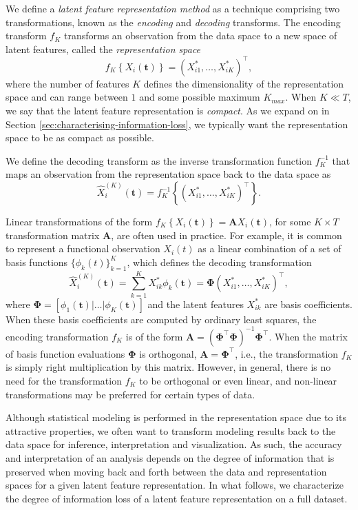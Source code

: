 We define a \emph{latent feature representation method} as a technique comprising two transformations, known as the \emph{encoding} and \emph{decoding} transforms.
The encoding transform $f_{K}$ transforms an observation from the data space to a new space of latent features, called the \emph{representation space}
$$
f_{K} \left\{X_i(\mathbf{t})\right\} = \left(X_{i1}^*, \dots,  X_{iK}^* \right)^\top,
$$
where the number of features $K$ defines the dimensionality of the representation space and can range between $1$ and some possible maximum $K_{max}$. When $K \ll T$, we say that the latent feature representation is \emph{compact}.
As we expand on in Section \ref{sec:characterising-information-loss}, we typically want the representation space to be as compact as possible.

We define the decoding transform as the inverse transformation function $f^{-1}_K$ that maps an observation from the representation space back to the data space as
$$
\widehat{X}_i^{(K)} (\mathbf{t}) = f_{K}^{-1} \left\{ \left(X_{i1}^*, \dots,  X_{iK}^* \right)^\top \right\}.
$$

Linear transformations of the form $f_{K} \left\{X_i(\mathbf{t})\right\} = \mathbf{A} X_i(\mathbf{t})$, for some $K \times T$ transformation matrix $\mathbf{A}$, are often used in practice.
For example, it is common to represent a functional observation $X_i(t)$ as a linear combination of a set of basis functions $\{\phi_k(t)\}_{k=1}^K$, which defines the decoding transformation
$$
\widehat{X}_i^{(K)} (\mathbf{t}) = \sum_{k=1}^K X_{ik}^* \phi_k(\mathbf{t}) = \boldsymbol{\Phi} \left(X_{i1}^*, \dots,  X_{iK}^* \right)^\top,
$$
where $\boldsymbol{\Phi} = \left[\phi_1(\mathbf{t}) | \dots | \phi_K(\mathbf{t}) \right]$ and the latent features $X_{ik}^*$ are basis coefficients. 
When these basis coefficients are computed by ordinary least squares, the encoding transformation $f_K$ is of the form $\mathbf{A} = \left( \boldsymbol{\Phi}^\top \boldsymbol{\Phi} \right)^{-1} \boldsymbol{\Phi}^\top$.
When the matrix of basis function evaluations $\boldsymbol{\Phi}$ is orthogonal, $\mathbf{A} = \boldsymbol{\Phi}^\top$, i.e., the transformation $f_K$ is simply right multiplication by this matrix.
However, in general, there is no need for the transformation $f_K$ to be orthogonal or even linear, and non-linear transformations may be preferred for certain types of data.

Although statistical modeling is performed in the representation space due to its attractive properties, we often want to transform modeling results back to the data space for inference, interpretation and visualization. 
As such, the accuracy and interpretation of an analysis depends on the degree of information that is preserved when moving back and forth between the data and representation spaces for a given latent feature representation.
In what follows, we characterize the degree of information loss of a latent feature representation on a full dataset.


